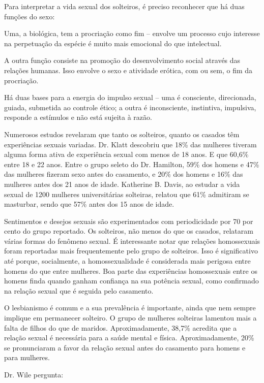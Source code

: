 Para interpretar a vida sexual dos solteiros, é preciso reconhecer que
há duas funções do sexo:

Uma, a biológica, tem a procriação como fim -- envolve um processo cujo
interesse na perpetuação da espécie é muito mais emocional do que
intelectual.

A outra função consiste na promoção do desenvolvimento social através
das relações humanas. Isso envolve o sexo e atividade erótica, com ou
sem, o fim da procriação.

Há duas bases para a energia do impulso sexual -- uma é consciente,
direcionada, guiada, submetida ao controle ético; a outra é
inconsciente, instintiva, impulsiva, responde a estímulos e não está
sujeita à razão.

\asterisc

Numerosos estudos revelaram que tanto os solteiros, quanto os casados
têm experiências sexuais variadas. Dr. Klatt descobriu que 18\% das
mulheres tiveram alguma forma ativa de experiência sexual com menos de
18 anos. E que 60,6\% entre 18 e 22 anos. Entre o grupo seleto do Dr.
Hamilton, 59\% dos homens e 47\% das mulheres fizeram sexo antes do
casamento, e 20\% dos homens e 16\% das mulheres antes dos 21 anos de
idade. Katherine B. Davis, ao estudar a vida sexual de 1200 mulheres
universitárias solteiras, relatou que 61\% admitiram se masturbar, sendo
que 57\% antes dos 15 anos de idade.

Sentimentos e desejos sexuais são experimentados com periodicidade por
70 por cento do grupo reportado. Os solteiros, não menos do que os
casados, relataram várias formas do fenômeno sexual. É interessante
notar que relações homossexuais foram reportadas mais frequentemente
pelo grupo de solteiros. Isso é significativo até porque, socialmente, a
homossexualidade é considerada mais perigosa entre homens do que entre
mulheres. Boa parte das experiências homossexuais entre os homens finda
quando ganham confiança na sua potência sexual, como confirmado na
relação sexual que é seguida pelo casamento.

O lesbianismo é comum e a sua prevalência é importante, ainda que nem
sempre implique em permanecer solteiro. O grupo de mulheres solteiras
lamentou mais a falta de filhos do que de maridos. Aproximadamente,
38,7\% acredita que a relação sexual é necessária para a saúde mental e
física. Aproximadamente, 20\% se pronunciaram a favor da relação sexual
antes do casamento para homens e para mulheres.

Dr. Wile pergunta:

